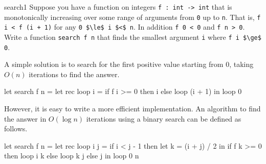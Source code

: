 %
\begin{exercise}{search1}
Suppose you have a function on integers \hbox{\lstinline/f : int -> int/} that is monotonically increasing
over some range of arguments from \hbox{\lstinline/0/} up to \hbox{\lstinline/n/}.  That is,
\hbox{\hbox{\lstinline/f i < f (i + 1)/}}
for any \hbox{\lstinline/0 $\le$ i $<$ n/}.  In addition \hbox{\lstinline/f 0 < 0/} and \hbox{\lstinline/f n > 0/}.
%
Write a function \hbox{\lstinline/search f n/} that finds the smallest argument \hbox{\lstinline/i/} where
\hbox{\hbox{\lstinline/f i $\ge$ 0/}}.

\begin{answer}\ifanswers
A simple solution is to search for the first positive value starting from 0,
taking $O(n)$ iterations to find the answer.

\begin{ocaml}
let search f n =
   let rec loop i =
      if f i >= 0 then
         i
      else
         loop (i + 1)
   in
      loop 0
\end{ocaml}
%
However, it is easy to write a more efficient implementation.  An algorithm to find the answer in
$O(\log n)$ iterations using a binary search can be defined as follows.

\begin{ocaml}
let search f n =
   let rec loop i j =
      if i < j - 1 then
         let k = (i + j) / 2 in
            if f k >= 0 then
               loop i k
            else
               loop k j
      else
         j
   in
      loop 0 n
\end{ocaml}
\fi\end{answer}
\end{exercise}


